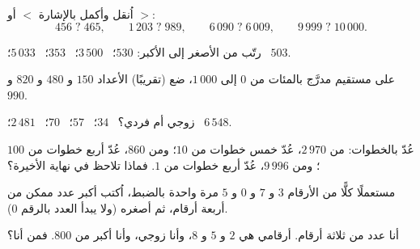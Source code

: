 \begin{exercise}[$\star$]\label{exo:g3:numbers:5}
اُنقل وأكمل بالإشارة $<$ أو $>$:
\[
456 \;?\; 465, \qquad
1\,203 \;?\; 989, \qquad
6\,090 \;?\; 6\,009, \qquad
9\,999 \;?\; 10\,000 .
\]
\end{exercise}

\begin{exercise}[$\star$]\label{exo:g3:numbers:6}
رتّب من الأصغر إلى الأكبر: $530$؛ \ $3\,500$؛ \ $353$؛ \ $5\,033$؛
\ $503$.
\end{exercise}

\begin{exercise}[$\star$]\label{exo:g3:numbers:7}
على مستقيم مدرَّج بالمئات من $0$ إلى $1\,000$، ضع
(تقريبًا) الأعداد $150$ و $480$ و $820$ و $990$.
\end{exercise}

\begin{exercise}[$\star$]\label{exo:g3:numbers:8}
زوجي أم فردي؟ \ $34$؛ \ $57$؛ \ $70$؛ \ $2\,481$؛ \ $6\,548$.
\end{exercise}

\begin{exercise}[$\star$]\label{exo:g3:numbers:9}
عُدّ بالخطوات: من $2\,970$، عُدّ خمس خطوات من $10$؛ ومن $860$،
عُدّ أربع خطوات من $100$؛ ومن $9\,996$، عُدّ أربع خطوات من $1$.
فماذا تلاحظ في نهاية الأخيرة؟
\end{exercise}

\begin{exercise}[$\star\star$]\label{exo:g3:numbers:10}
مستعملًا كلًّا من الأرقام $3$ و $7$ و $0$ و $5$ مرة واحدة
بالضبط، اُكتب أكبر عدد ممكن من أربعة أرقام، ثم أصغره (ولا يبدأ
العدد بالرقم $0$).
\end{exercise}

\begin{exercise}[$\star\star$]\label{exo:g3:numbers:11}
أنا عدد من ثلاثة أرقام. أرقامي هي $2$ و $5$ و $8$، وأنا زوجي،
وأنا أكبر من $800$. فمن أنا؟
\end{exercise}
